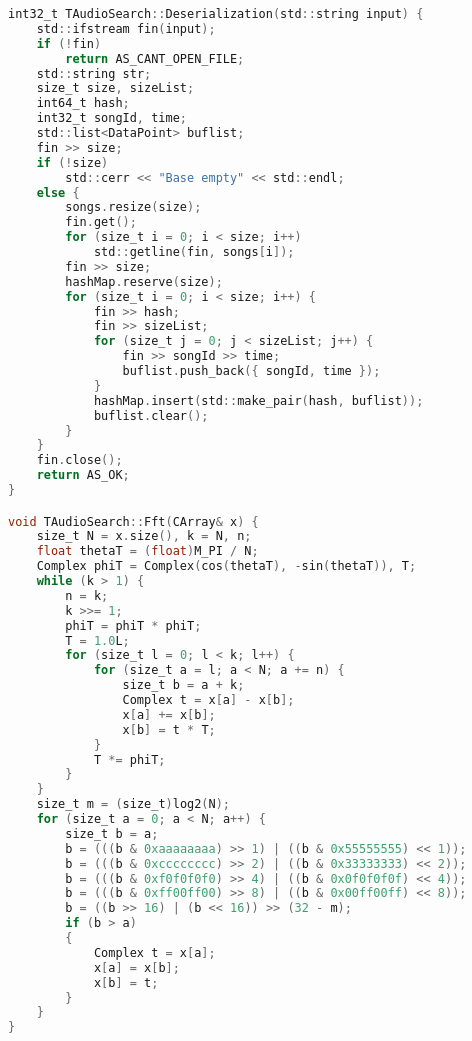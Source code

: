 \begin{lstlisting}[language=C, mathescape]
int32_t TAudioSearch::Deserialization(std::string input) {
    std::ifstream fin(input);
    if (!fin)
        return AS_CANT_OPEN_FILE;
    std::string str;
    size_t size, sizeList;
    int64_t hash;
    int32_t songId, time;
    std::list<DataPoint> buflist;
    fin >> size;
    if (!size) 
        std::cerr << "Base empty" << std::endl;
    else {
        songs.resize(size);
        fin.get();
        for (size_t i = 0; i < size; i++)
            std::getline(fin, songs[i]);
        fin >> size;
        hashMap.reserve(size);
        for (size_t i = 0; i < size; i++) {
            fin >> hash;
            fin >> sizeList;
            for (size_t j = 0; j < sizeList; j++) {
                fin >> songId >> time;
                buflist.push_back({ songId, time });
            }
            hashMap.insert(std::make_pair(hash, buflist));
            buflist.clear();
        }
    }
    fin.close();
    return AS_OK;
}

void TAudioSearch::Fft(CArray& x) {
    size_t N = x.size(), k = N, n;
    float thetaT = (float)M_PI / N;
    Complex phiT = Complex(cos(thetaT), -sin(thetaT)), T;
    while (k > 1) {
        n = k;
        k >>= 1;
        phiT = phiT * phiT;
        T = 1.0L;
        for (size_t l = 0; l < k; l++) {
            for (size_t a = l; a < N; a += n) {
                size_t b = a + k;
                Complex t = x[a] - x[b];
                x[a] += x[b];
                x[b] = t * T;
            }
            T *= phiT;
        }
    }
    size_t m = (size_t)log2(N);
    for (size_t a = 0; a < N; a++) {
        size_t b = a;
        b = (((b & 0xaaaaaaaa) >> 1) | ((b & 0x55555555) << 1));
        b = (((b & 0xcccccccc) >> 2) | ((b & 0x33333333) << 2));
        b = (((b & 0xf0f0f0f0) >> 4) | ((b & 0x0f0f0f0f) << 4));
        b = (((b & 0xff00ff00) >> 8) | ((b & 0x00ff00ff) << 8));
        b = ((b >> 16) | (b << 16)) >> (32 - m);
        if (b > a)
        {
            Complex t = x[a];
            x[a] = x[b];
            x[b] = t;
        }
    }
}


\end{lstlisting}
